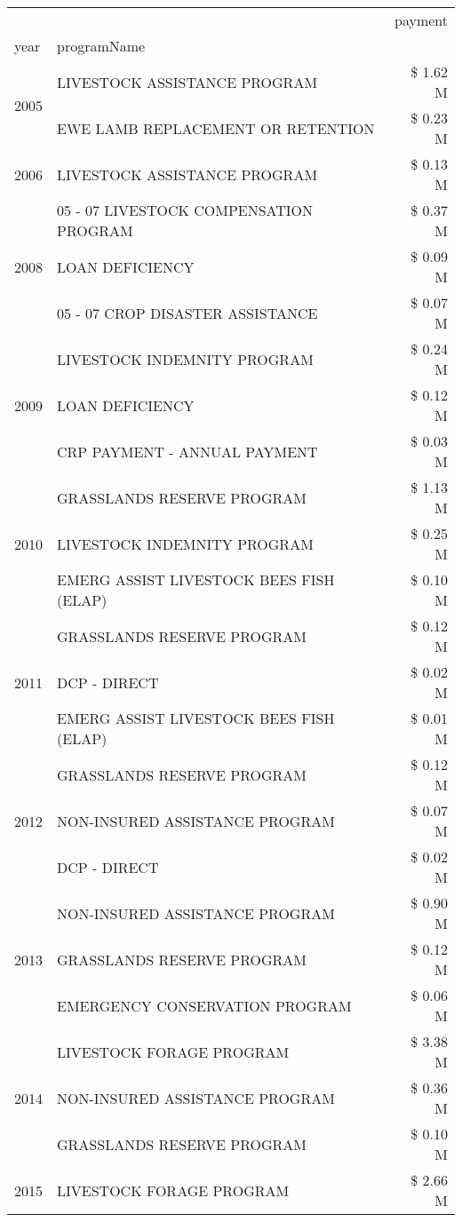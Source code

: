 \begin{tabular}{llr}
\toprule
 &  & payment \\
year & programName &  \\
\midrule
\multirow[t]{2}{*}{2005} & LIVESTOCK ASSISTANCE PROGRAM & \$ 1.62 M \\
 & EWE LAMB REPLACEMENT OR RETENTION & \$ 0.23 M \\
\cline{1-3}
2006 & LIVESTOCK ASSISTANCE PROGRAM & \$ 0.13 M \\
\cline{1-3}
\multirow[t]{3}{*}{2008} & 05 - 07 LIVESTOCK COMPENSATION PROGRAM & \$ 0.37 M \\
 & LOAN DEFICIENCY & \$ 0.09 M \\
 & 05 - 07 CROP DISASTER ASSISTANCE & \$ 0.07 M \\
\cline{1-3}
\multirow[t]{3}{*}{2009} & LIVESTOCK INDEMNITY PROGRAM & \$ 0.24 M \\
 & LOAN DEFICIENCY & \$ 0.12 M \\
 & CRP PAYMENT - ANNUAL PAYMENT & \$ 0.03 M \\
\cline{1-3}
\multirow[t]{3}{*}{2010} & GRASSLANDS RESERVE PROGRAM & \$ 1.13 M \\
 & LIVESTOCK INDEMNITY PROGRAM & \$ 0.25 M \\
 & EMERG ASSIST LIVESTOCK BEES FISH (ELAP) & \$ 0.10 M \\
\cline{1-3}
\multirow[t]{3}{*}{2011} & GRASSLANDS RESERVE PROGRAM & \$ 0.12 M \\
 & DCP - DIRECT & \$ 0.02 M \\
 & EMERG ASSIST LIVESTOCK BEES FISH (ELAP) & \$ 0.01 M \\
\cline{1-3}
\multirow[t]{3}{*}{2012} & GRASSLANDS RESERVE PROGRAM & \$ 0.12 M \\
 & NON-INSURED ASSISTANCE PROGRAM & \$ 0.07 M \\
 & DCP - DIRECT & \$ 0.02 M \\
\cline{1-3}
\multirow[t]{3}{*}{2013} & NON-INSURED ASSISTANCE PROGRAM & \$ 0.90 M \\
 & GRASSLANDS RESERVE PROGRAM & \$ 0.12 M \\
 & EMERGENCY CONSERVATION PROGRAM & \$ 0.06 M \\
\cline{1-3}
\multirow[t]{3}{*}{2014} & LIVESTOCK FORAGE PROGRAM & \$ 3.38 M \\
 & NON-INSURED ASSISTANCE PROGRAM & \$ 0.36 M \\
 & GRASSLANDS RESERVE PROGRAM & \$ 0.10 M \\
\cline{1-3}
\multirow[t]{3}{*}{2015} & LIVESTOCK FORAGE PROGRAM & \$ 2.66 M \\

\end{tabular}
